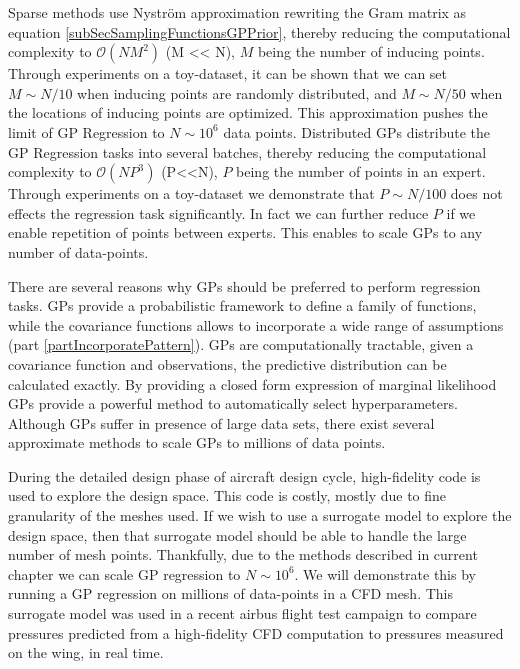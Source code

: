 Sparse methods use Nystr\"{o}m approximation rewriting the Gram matrix as equation \ref{subSecSamplingFunctionsGPPrior}, thereby reducing the computational complexity to $\mathcal{O}(NM^{2})$ (M << N), $M$ being the number of inducing points. Through experiments on a toy-dataset, it can be shown that we can set $M \sim N/10$ when inducing points are randomly distributed, and $M \sim N/50$ when the locations of inducing points are optimized. This approximation pushes the limit of GP Regression to $N \sim 10^6$ data points. Distributed GPs distribute the GP Regression tasks into several batches, thereby reducing the computational complexity to $\mathcal{O}(NP^{3})$ (P<<N), $P$ being the number of points in an expert. Through experiments on a toy-dataset we demonstrate that $P \sim N/100$ does not effects the regression task significantly. In fact we can further reduce $P$ if we enable repetition of points between experts. This enables to scale GPs to any number of data-points.

There are several reasons why GPs should be preferred to perform regression tasks. GPs provide a probabilistic framework to define a family of functions, while the covariance functions allows to incorporate a wide range of assumptions (part \ref{partIncorporatePattern}). GPs are computationally tractable, given a covariance function and observations, the predictive distribution can be calculated exactly. By providing a closed form expression of marginal likelihood GPs provide a powerful method to automatically select hyperparameters. Although GPs suffer in presence of large data sets, there exist several approximate methods to scale GPs to millions of data points. 

During the detailed design phase of aircraft design cycle, high-fidelity code is used to explore the design space. This code is costly, mostly due to fine granularity of the meshes used. If we wish to use a surrogate model to explore the design space, then that surrogate model should be able to handle the large number of mesh points. Thankfully, due to the methods described in current chapter we can scale GP regression to $N \sim 10^6$. We will demonstrate this by running a GP regression on millions of data-points in a CFD mesh. This surrogate model was used in a recent airbus flight test campaign to compare pressures predicted from a high-fidelity CFD computation to pressures measured on the wing, in real time.

